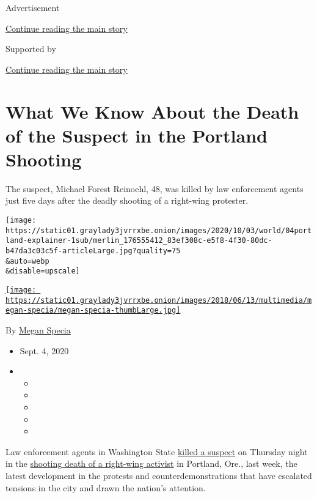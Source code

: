 Advertisement

\protect\hyperlink{after-top}{Continue reading the main story}

Supported by

\protect\hyperlink{after-sponsor}{Continue reading the main story}

\hypertarget{what-we-know-about-the-death-of-the-suspect-in-the-portland-shooting}{%
\section{What We Know About the Death of the Suspect in the Portland
Shooting}\label{what-we-know-about-the-death-of-the-suspect-in-the-portland-shooting}}

The suspect, Michael Forest Reinoehl, 48, was killed by law enforcement
agents just five days after the deadly shooting of a right-wing
protester.

\texttt{[image: https://static01.graylady3jvrrxbe.onion/images/2020/10/03/world/04portland-explainer-1sub/merlin\_176555412\_83ef308c-e5f8-4f30-80dc-b47da3c03c5f-articleLarge.jpg?quality=75\\\&auto=webp\\\&disable=upscale]}

\href{https://www.nytimes3xbfgragh.onion/by/megan-specia}{\texttt{[image: https://static01.graylady3jvrrxbe.onion/images/2018/06/13/multimedia/megan-specia/megan-specia-thumbLarge.jpg]}}

By \href{https://www.nytimes3xbfgragh.onion/by/megan-specia}{Megan
Specia}

\begin{itemize}
\item
  Sept. 4, 2020
\item
  \begin{itemize}
  \item
  \item
  \item
  \item
  \item
  \end{itemize}
\end{itemize}

Law enforcement agents in Washington State
\href{https://www.nytimes3xbfgragh.onion/2020/09/03/us/michael-reinoehl-arrest-portland-shooting.html?action=click\&module=Top\%20Stories\&pgtype=Homepage}{killed
a suspect} on Thursday night in the
\href{https://www.nytimes3xbfgragh.onion/2020/08/30/us/portland-trump-rally-shooting.html}{shooting
death of a right-wing activist} in Portland, Ore., last week, the latest
development in the protests and counterdemonstrations that have
escalated tensions in the city and drawn the nation's attention.

